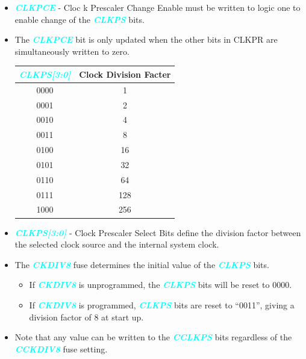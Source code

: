 \documentclass{article}
\newcommand{\bitFormat}[1]{\emph{\textbf{\textcolor{cyan}{#1}}}}
\begin{document}
\begin{itemize}
    \item \bitFormat{CLKPCE} - Cloc k Prescaler Change Enable must be written to logic one to enable change of the \bitFormat{CLKPS} bits.
    \item The \bitFormat{CLKPCE} bit is only updated when the other bits in CLKPR are simultaneously written to zero.
    
    \begin{table}[H]
        \begin{center}
            \begin{tabular}{c|c}
                \bitFormat{CLKPS[3:0]} & \textbf{Clock Division Facter}\\
                \hline
                0000 & 1\\
                0001 & 2\\
                0010 & 4\\
                0011 & 8\\
                0100 & 16\\
                0101 & 32\\
                0110 & 64\\
                0111 & 128\\
                1000 & 256\\                
            \end{tabular}
        \end{center}
    \end{table}

    \item \bitFormat{CLKPS[3:0]} - Clock Prescaler Select Bits define the division factor between the selected clock source and the internal system clock.
    \item The \bitFormat{CKDIV8} fuse determines the initial value of the \bitFormat{CLKPS} bits. 
    \begin{itemize}
        \item If \bitFormat{CKDIV8} is unprogrammed, the \bitFormat{CLKPS} bits will be reset to 0000.
        \item If \bitFormat{CKDIV8} is programmed, \bitFormat{CLKPS} bits are reset to “0011”, giving a division factor of 8 at start up.
    \end{itemize} 
    \item Note that any value can be written to the \bitFormat{CCLKPS} bits regardless of the \bitFormat{CCKDIV8} fuse setting.
\end{itemize}
\end{document}
